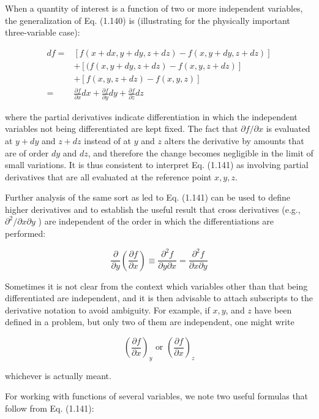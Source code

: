 \documentclass[10pt]{article}
\begin{document}
When a quantity of interest is a function of two or more independent variables, the generalization of Eq. (1.140) is (illustrating for the physically important three-variable case):


\begin{align*}
d f= & {[f(x+d x, y+d y, z+d z)-f(x, y+d y, z+d z)] } \\
& +[(f(x, y+d y, z+d z)-f(x, y, z+d z)] \\
& +[f(x, y, z+d z)-f(x, y, z)] \\
= & \frac{\partial f}{\partial x} d x+\frac{\partial f}{\partial y} d y+\frac{\partial f}{\partial z} d z \tag{1.141}
\end{align*}


where the partial derivatives indicate differentiation in which the independent variables not being differentiated are kept fixed. The fact that $\partial f / \partial x$ is evaluated at $y+d y$ and $z+d z$ instead of at $y$ and $z$ alters the derivative by amounts that are of order $d y$ and $d z$, and therefore the change becomes negligible in the limit of small variations. It is thus consistent to interpret Eq. (1.141) as involving partial derivatives that are all evaluated at the reference point $x, y, z$.

Further analysis of the same sort as led to Eq. (1.141) can be used to define higher derivatives and to establish the useful result that cross derivatives (e.g., $\partial^{2} / \partial x \partial y$ ) are independent of the order in which the differentiations are performed:


\begin{equation*}
\frac{\partial}{\partial y}\left(\frac{\partial f}{\partial x}\right) \equiv \frac{\partial^{2} f}{\partial y \partial x}=\frac{\partial^{2} f}{\partial x \partial y} \tag{1.142}
\end{equation*}


Sometimes it is not clear from the context which variables other than that being differentiated are independent, and it is then advisable to attach subscripts to the derivative notation to avoid ambiguity. For example, if $x, y$, and $z$ have been defined in a problem, but only two of them are independent, one might write

$$
\left(\frac{\partial f}{\partial x}\right)_{y} \text { or }\left(\frac{\partial f}{\partial x}\right)_{z}
$$

whichever is actually meant.

For working with functions of several variables, we note two useful formulas that follow from Eq. (1.141):
\end{document}

